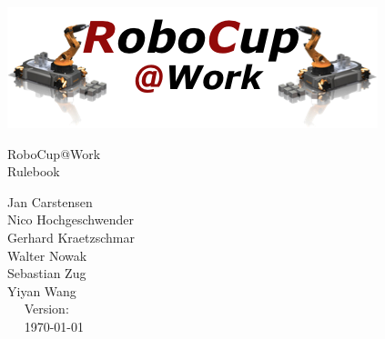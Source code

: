 \begin{titlepage}
  \begin{center}
    {
      
      \includegraphics[width=\textwidth]{images/logo_RoboCupAtWork.png}\\[1.23ex]
    }
    \vspace{2.7 cm}
    \hrulefill\par
    {%
      \vspace*{.27cm}
      \Huge{RoboCup@Work}\\[1.23ex]
      \Large Rulebook \\[2ex]
    }
    



    \hrulefill\par
    
    \vfill

    
	Jan Carstensen\\
	Nico Hochgeschwender\\
	Gerhard Kraetzschmar\\
	Walter Nowak\\
	Sebastian Zug\\
	Yiyan Wang\\
    
    \vfill
    ~~ Version: \YEAR ~~ \\
    ~~  \today ~~ \\
  \end{center}
\end{titlepage}
